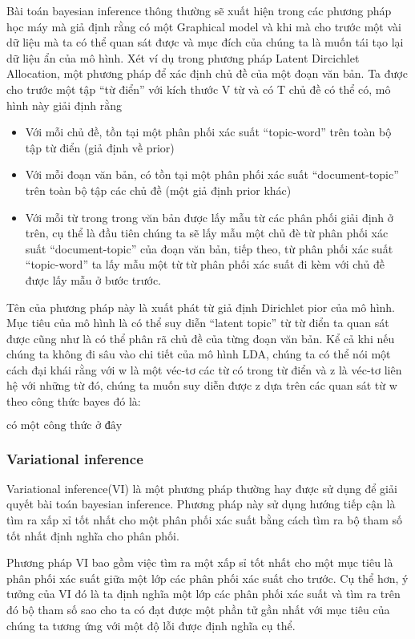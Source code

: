         Bài toán bayesian inference thông thường sẽ xuất hiện trong các phương pháp học máy mà giả định rằng có một Graphical model và khi mà cho trước một vài dữ liệu mà ta có thể quan sát được và mục đích của chúng ta là muốn tái tạo lại dữ liệu ẩn của mô hình. Xét ví dụ trong phương pháp Latent Dircichlet Allocation, một phương pháp để xác định chủ đề của một đoạn văn bản. Ta được cho trước một tập ``từ điển'' với kích thước V từ và có T chủ đề có thể có, mô hình này giải định rằng
        \begin{itemize}
            \item Với mỗi chủ đề, tồn tại một phân phối xác suất ``topic-word''  trên toàn bộ tập từ điển (giả định về prior)
            \item Với mỗi đoạn văn bản, có tồn tại một phân phối xác suất ``document-topic'' trên toàn bộ tập các chủ đề (một giả định prior khác)
            \item Với mỗi từ trong trong văn bản được lấy mẫu từ các phân phối giải định ở trên, cụ thể là đầu tiên chúng ta sẽ lấy mẫu một chủ đè từ phân phối xác suất ``document-topic'' của đoạn văn bản, tiếp theo, từ phân phối xác suất ``topic-word'' ta lấy mẫu một từ từ phân phối xác suất đi kèm với chủ đề được lấy mẫu ở bước trước. 
        \end{itemize}
        Tên của phương pháp này là xuất phát từ giả định Dirichlet pior của mô hình. Mục tiêu của mô hình là có thể suy diễn ``latent topic'' từ từ điển ta quan sát được cũng như là có thể phân rã chủ đề của từng đoạn văn bản. Kể cả khi nếu chúng ta không đi sâu vào chi tiết của mô hình LDA, chúng ta có thể nói một cách đại khái rằng với w là một véc-tơ các từ có trong từ điển và z là véc-tơ liên hệ với những từ đó, chúng ta muốn suy diễn được z dựa trên các quan sát từ w theo công thức bayes đó là:

                $\text{có một công thức ở đây}$
 
        
        \subsubsection{Variational inference}
        Variational inference(VI) là một phương pháp thường hay được sử dụng để giải quyết bài toán bayesian inference. Phương pháp này sử dụng hướng tiếp cận là tìm ra xấp xỉ tốt nhất cho một phân phối xác suất bằng cách tìm ra bộ tham số tốt nhất định nghĩa cho phân phối. 

        Phương pháp VI bao gồm việc tìm ra một xấp sỉ tốt nhất cho một mục tiêu là phân phối xác suất giữa một lớp các phân phối xác suất cho trước. Cụ thể hơn, ý tưởng của VI đó là ta định nghĩa một lớp các phân phối xác suất và tìm ra trên đó bộ tham số sao cho ta có đạt được một phần tử gần nhất với mục tiêu của chúng ta tương ứng với một độ lỗi được định nghĩa cụ thể. 

